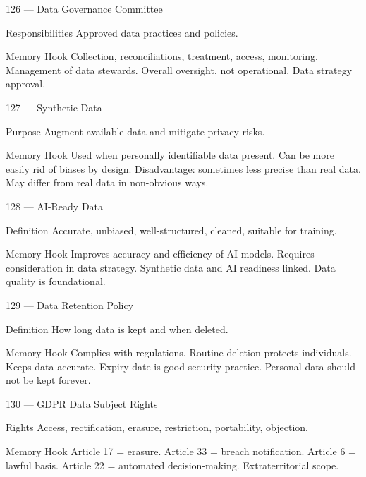 \documentclass[aspectratio=169,8pt]{beamer}
\begin{document}
	\begin{frame}{126 --- Data Governance Committee}
		\begin{block}{Responsibilities}
			Approved data practices and policies.
		\end{block}
		\begin{block}{Memory Hook}
			Collection, reconciliations, treatment, access, monitoring. Management of data stewards. Overall oversight, not operational. Data strategy approval.
		\end{block}
	\end{frame}
	
	\begin{frame}{127 --- Synthetic Data}
		\begin{block}{Purpose}
			Augment available data and mitigate privacy risks.
		\end{block}
		\begin{block}{Memory Hook}
			Used when personally identifiable data present. Can be more easily rid of biases by design. Disadvantage: sometimes less precise than real data. May differ from real data in non-obvious ways.
		\end{block}
	\end{frame}
	
	\begin{frame}{128 --- AI-Ready Data}
		\begin{block}{Definition}
			Accurate, unbiased, well-structured, cleaned, suitable for training.
		\end{block}
		\begin{block}{Memory Hook}
			Improves accuracy and efficiency of AI models. Requires consideration in data strategy. Synthetic data and AI readiness linked. Data quality is foundational.
		\end{block}
	\end{frame}
	
	\begin{frame}{129 --- Data Retention Policy}
		\begin{block}{Definition}
			How long data is kept and when deleted.
		\end{block}
		\begin{block}{Memory Hook}
			Complies with regulations. Routine deletion protects individuals. Keeps data accurate. Expiry date is good security practice. Personal data should not be kept forever.
		\end{block}
	\end{frame}
	
	\begin{frame}{130 --- GDPR Data Subject Rights}
		\begin{block}{Rights}
			Access, rectification, erasure, restriction, portability, objection.
		\end{block}
		\begin{block}{Memory Hook}
			Article 17 = erasure. Article 33 = breach notification. Article 6 = lawful basis. Article 22 = automated decision-making. Extraterritorial scope.
		\end{block}
	\end{frame}
	
\end{document}
